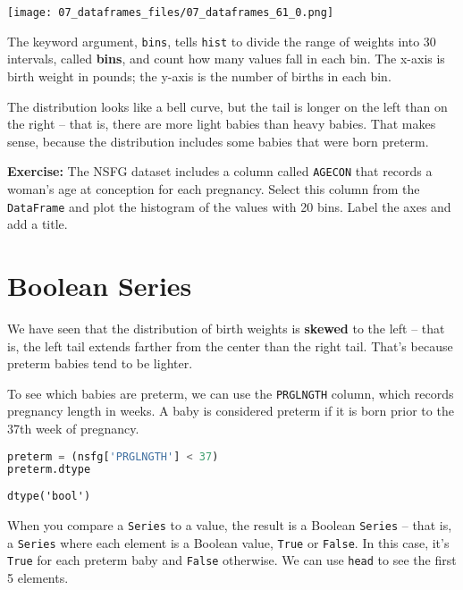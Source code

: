 \begin{center}
\texttt{[image: 07\_dataframes\_files/07\_dataframes\_61\_0.png]}
\end{center}

The keyword argument, \passthrough{\lstinline!bins!}, tells
\passthrough{\lstinline!hist!} to divide the range of weights into 30
intervals, called \textbf{bins}, and count how many values fall in each
bin. The x-axis is birth weight in pounds; the y-axis is the number of
births in each bin.

The distribution looks like a bell curve, but the tail is longer on the
left than on the right -- that is, there are more light babies than
heavy babies. That makes sense, because the distribution includes some
babies that were born preterm.

\textbf{Exercise:} The NSFG dataset includes a column called
\passthrough{\lstinline!AGECON!} that records a woman's age at
conception for each pregnancy. Select this column from the
\passthrough{\lstinline!DataFrame!} and plot the histogram of the values
with 20 bins. Label the axes and add a title.

\section{Boolean Series}\label{boolean-series}

We have seen that the distribution of birth weights is \textbf{skewed}
to the left -- that is, the left tail extends farther from the center
than the right tail. That's because preterm babies tend to be lighter.

\pagebreak

To see which babies are preterm, we can use the
\passthrough{\lstinline!PRGLNGTH!} column, which records pregnancy
length in weeks. A baby is considered preterm if it is born prior to the
37th week of pregnancy.

\begin{lstlisting}[language=Python,style=source]
preterm = (nsfg['PRGLNGTH'] < 37)
preterm.dtype
\end{lstlisting}

\begin{lstlisting}[style=output]
dtype('bool')
\end{lstlisting}

When you compare a \passthrough{\lstinline!Series!} to a value, the
result is a Boolean \passthrough{\lstinline!Series!} -- that is, a
\passthrough{\lstinline!Series!} where each element is a Boolean value,
\passthrough{\lstinline!True!} or \passthrough{\lstinline!False!}. In
this case, it's \passthrough{\lstinline!True!} for each preterm baby and
\passthrough{\lstinline!False!} otherwise. We can use
\passthrough{\lstinline!head!} to see the first 5 elements.

